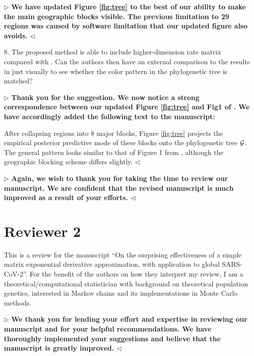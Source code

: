 \documentclass[12pt]{article}
\newenvironment{reply}{$\triangleright$\bfseries}{$\triangleleft$}
\renewenvironment{quote}
               {\list{}{\rightmargin\leftmargin}%
                \item\relax\normalfont}
               {\endlist}
\newcommand{\phylogeny}{{\cal G}}
\begin{document}
\begin{reply}
We have updated Figure \ref{fig:tree} to the best of our ability to make the main geographic blocks visible.  The previous limitation to 29 regions was caused by software limitation that our updated figure also avoids.
\end{reply}


8.	The proposed method is able to include higher-dimension rate matrix compared with \citet{lemey2009bayesian,lemey2014unifying}. Can the authors then have an external comparison to the results in \citet{lemey2020accommodating} just visually to see whether the color pattern in the phylogenetic tree is matched?


\begin{reply}
	Thank you for the suggestion.  We now notice a strong correspondence between our updated Figure \ref{fig:tree} and Fig1 of \citet{lemey2020accommodating}.  We have accordingly added the following text to the manuscript:
	\begin{quote}
		After collapsing regions into 8 major blocks, Figure \ref{fig:tree} projects the empirical posterior predictive mode of these blocks onto the phylogenetic tree $\phylogeny$.  The general pattern looks similar to that of Figure 1 from \cite{lemey2020accommodating}, although the geographic blocking scheme differs slightly.
	\end{quote}
\end{reply}


\begin{reply}
	Again, we wish to thank you for taking the time to review our manuscript.  We are confident that the revised manuscript is much improved as a result of your efforts.
\end{reply}


\section*{Reviewer 2}

This is a review for the manuscript ``On the surprising effectiveness of a simple matrix exponential derivative approximation, with application to global SARS-CoV-2''. 
For the benefit of the authors on how they interpret my review, I am a theoretical/computational statistician with background on theoretical population genetics, interested in Markov chains and its implementations in Monte Carlo methods. 

\begin{reply}
	We thank you for lending your effort and expertise in reviewing our manuscript and for your helpful recommendations.  We have thoroughly implemented your suggestions and believe that the manuscript is greatly improved.  
\end{reply}
\end{document}
